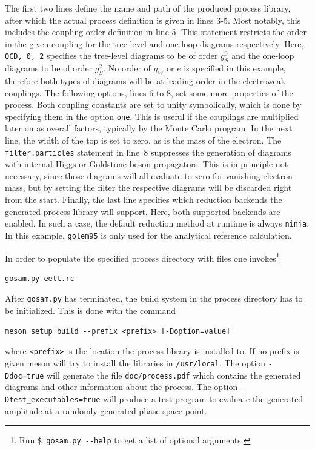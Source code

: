 The first two lines define the name and path of the produced process library, after which the actual process definition is given in lines 3-5. Most notably, this includes the coupling order definition in line 5. This statement restricts the order in the given coupling for the tree-level and one-loop diagrams respectively. Here, \texttt{QCD, 0, 2} specifies the tree-level diagrams to be of order $g_S^0$ and the one-loop diagrams to be of order $g_S^2$. No order of $g_W$ or $e$ is specified in this example, therefore both types of diagrams will be at leading order in the electroweak couplings.
The following options, lines 6 to 8, set some more properties of the process. Both coupling constants are set to unity symbolically, which is done by specifying them in the option \texttt{one}. This is useful if the couplings are multiplied later on as overall factors, typically by the Monte Carlo program. In the next line, the width of the top is set to zero, as is the mass of the electron. The \texttt{filter.particles} statement in line~8 suppresses the generation of diagrams with internal Higgs or Goldstone boson propagators. This is in principle not necessary, since those diagrams will all evaluate to zero for vanishing electron mass, but by setting the filter the respective diagrams will be discarded right from the start. Finally, the last line specifies which reduction backends the generated process library will support. Here, both supported backends are enabled. In such a case, the default reduction method at runtime is always \texttt{ninja}. In this example, \texttt{golem95} is only used for the analytical reference calculation.

In order to populate the specified process directory with files one invokes\footnote{Run \lstinline[style=sh]|$ gosam.py --help| to get a list of optional arguments.}
\begin{lstlisting}[style=sh]
gosam.py eett.rc
\end{lstlisting}

After \texttt{gosam{.}py} has terminated, the build system in the process directory has to be initialized. This is done with the command
\begin{lstlisting}[style=sh]
meson setup build --prefix <prefix> [-Doption=value]
\end{lstlisting}
where \texttt{<prefix>} is the location the process library is installed to. If no prefix is given meson will try to install the libraries in \texttt{/usr/local}.  The option \texttt{-Ddoc=true} will generate the file \texttt{doc/process.pdf} which contains the generated diagrams and other information about the process. The option \texttt{-Dtest\_executables=true} will produce a test program to evaluate the generated amplitude at a randomly generated phase space point.

